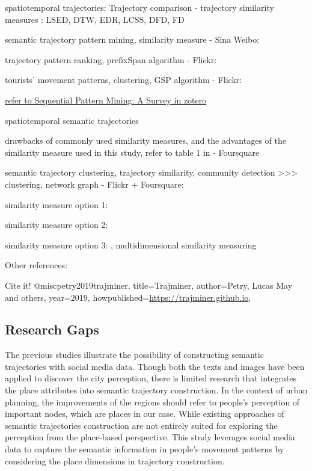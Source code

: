 \documentclass{article}
\begin{document}
spatiotemporal trajectories:
Trajectory comparison - trajectory similarity measures \cite{tao_comparative_2021}: LSED, DTW, EDR, LCSS, DFD, FD

semantic trajectory pattern mining, similarity measure - Sina Weibo: \cite{wan_semantic-geographic_2017}

trajectory pattern ranking, prefixSpan algorithm - Flickr:  \cite{yin_diversified_2011}

tourists' movement patterns, clustering, GSP algorithm - Flickr: \cite{hopken_flickr_2020}

\underline{refer to Sequential Pattern Mining: A Survey in zotero}

spatiotemporal semantic trajectories

drawbacks of commonly used similarity measures, and the advantages of the similarity measure used in this study, refer to table 1 in \cite{petry_towards_2019} - Foursquare

semantic trajectory clustering, trajectory similarity, community detection >>> clustering, network graph - Flickr + Foursquare: \cite{liu_stccd_2020}

similarity measure option 1:
\cite{petry_towards_2019}

similarity measure option 2:
\cite{ferrero_mastermovelets_2020}

similarity measure option 3:
\cite{furtado_multidimensional_2016}, multidimensional similarity measuring

Other references:
\cite{xiao_inferring_2014}

Cite it!
@misc{petry2019trajminer,
  title={Trajminer},
  author={Petry, Lucas May and others},
  year={2019},
  howpublished={\url{https://trajminer.github.io}},
}


\subsection{Research Gaps}
The previous studies illustrate the possibility of constructing semantic trajectories with social media data. Though both the texts and images have been applied to discover the city perception, there is limited research that integrates the place attributes into semantic trajectory construction. In the context of urban planning, the improvements of the regions should refer to people’s perception of important nodes, which are places in our case. While existing approaches of semantic trajectories construction are not entirely suited for exploring the perception from the place-based perspective. This study leverages social media data to capture the semantic information in people’s movement patterns by considering the place dimensions in trajectory construction.
\newpage
\end{document}
